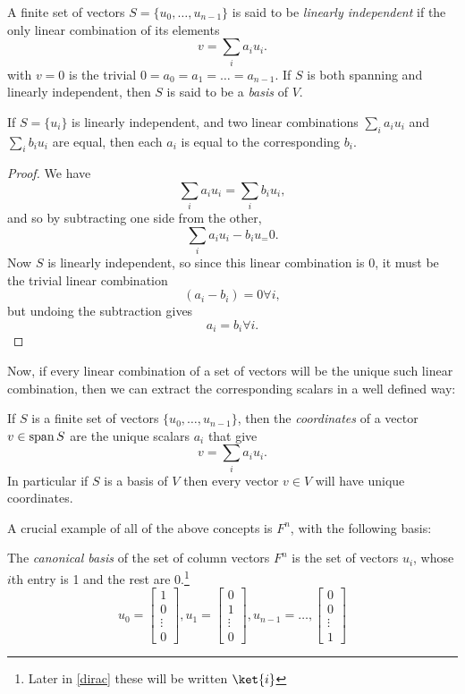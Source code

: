 \begin{define}
A finite set of vectors $S = \{u_0, \dots, u_{n-1}\}$ is said to be \emph{linearly independent} if the only linear combination of its elements
\[v = \sum_i a_i u_i.\]
with $v = 0$ is the trivial $0 = a_0 = a_1 = \dots = a_{n-1}$. If $S$ is both spanning and linearly independent, then $S$ is said to be a \emph{basis} of $V$.
\end{define}

\begin{prop}
	If $S = \{u_i\}$ is linearly independent, and two linear combinations $\sum_i a_iu_i$ and $\sum_i b_iu_i$ are equal, then each $a_i$ is equal to the corresponding $b_i$.
\end{prop}
\begin{proof}
	We have
	\[\sum_i a_iu_i = \sum_i b_iu_i,\]
	and so by subtracting one side from the other,
	\[\sum_i a_iu_i-b_iu_ = 0.\]
	Now $S$ is linearly independent, so since this linear combination is $0$, it must be the trivial linear combination
	\[(a_i - b_i) = 0 \forall i,\]
	but undoing the subtraction gives
	\[a_i = b_i \forall i.\]
\end{proof}

Now, if every linear combination of a set of vectors will be the unique such linear combination, then we can extract the corresponding scalars in a well defined way:

\begin{define}
If $S$ is a finite set of vectors $\{u_0, \dots, u_{n-1}\}$, then the \emph{coordinates} of a vector $v \in \operatorname{span} S$ are the unique scalars $a_i$ that give
\[v = \sum_i a_i u_i.\]
In particular if $S$ is a basis of $V$ then every vector $v \in V$ will have unique coordinates.
\end{define}

A crucial example of all of the above concepts is $F^n$, with the following basis:
\begin{define}\label{canonical-basis}
	The \emph{canonical basis} of the set of column vectors $F^n$ is the set of vectors $u_i$, whose $i$th entry is 1 and the rest are 0.\footnote{Later in \autoref{dirac} these will be written $\ket{i}$}
	\[u_0 = \begin{bmatrix}
		1 \\ 0 \\ \vdots \\ 0
	\end{bmatrix}, u_1 = \begin{bmatrix}
		0 \\ 1 \\ \vdots \\ 0
	\end{bmatrix}, u_{n-1} = \dots, \begin{bmatrix}
		0 \\ 0 \\ \vdots \\ 1
	\end{bmatrix}\]
\end{define}

